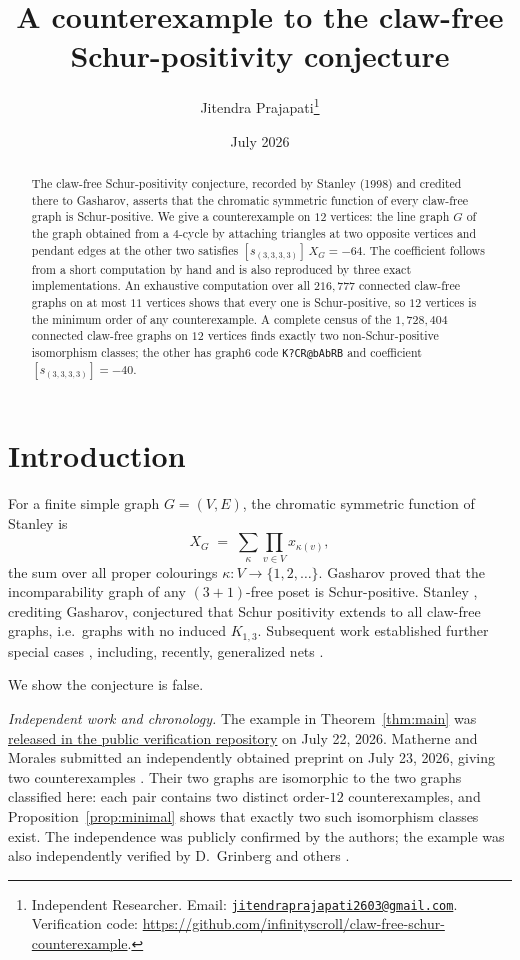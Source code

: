 \documentclass[11pt]{article}
\title{A counterexample to the claw-free Schur-positivity conjecture}
\author{Jitendra Prajapati\thanks{Independent Researcher. Email:
\href{mailto:jitendraprajapati2603@gmail.com}{\nolinkurl{jitendraprajapati2603@gmail.com}}. Verification code:
\url{https://github.com/infinityscroll/claw-free-schur-counterexample}.}}
\date{July 2026}
\theoremstyle{remark}
\newcommand{\csf}{X}
\begin{document}
\maketitle

\begin{abstract}
The claw-free Schur-positivity conjecture, recorded by Stanley (1998) and
credited there to Gasharov, asserts that the chromatic symmetric function of
every claw-free graph is Schur-positive. We give a counterexample
on $12$ vertices: the line graph $G$ of the graph obtained from a
$4$-cycle by attaching triangles at two opposite vertices and pendant edges
at the other two satisfies $[s_{(3,3,3,3)}]\,\csf_G = -64$. The coefficient
follows from a short computation by hand and is also reproduced by three exact
implementations. An exhaustive computation over all
$216{,}777$ connected claw-free graphs on at most $11$ vertices shows that
every one is Schur-positive, so $12$ vertices is the minimum order of any
counterexample. A complete census of the $1{,}728{,}404$ connected claw-free
graphs on $12$ vertices finds exactly two non-Schur-positive isomorphism
classes; the other has graph6 code
\texttt{K?\textasciigrave CR@\textasciigrave bAbRB} and coefficient
$[s_{(3,3,3,3)}]=-40$.
\end{abstract}

\section{Introduction}

For a finite simple graph $G = (V, E)$, the chromatic symmetric function of
Stanley \cite{Stanley95} is
\[
\csf_G \;=\; \sum_{\kappa} \prod_{v \in V} x_{\kappa(v)},
\]
the sum over all proper colourings $\kappa \colon V \to \{1, 2, \dots\}$.
Gasharov \cite{Gasharov96} proved that the incomparability graph of any
$(3+1)$-free poset is Schur-positive. Stanley
\cite[Conjecture~1.4]{Stanley98}, crediting Gasharov, conjectured that Schur
positivity extends to all claw-free graphs, i.e.\ graphs with no induced
$K_{1,3}$. Subsequent work established further special cases
\cite{Gasharov99}, including, recently, generalized nets \cite{SW25}.

We show the conjecture is false.

\emph{Independent work and chronology.} The example in
Theorem~\ref{thm:main} was
\href{https://github.com/infinityscroll/claw-free-schur-counterexample/commit/7747970833d8d4ce2dadba8f89a184cb52d814a9}
{released in the public verification repository} on July 22, 2026.
Matherne and Morales submitted an independently obtained
preprint on July 23, 2026, giving two counterexamples \cite{MM26}. Their two
graphs are isomorphic to the two graphs classified here: each pair contains
two distinct order-$12$ counterexamples, and Proposition~\ref{prop:minimal}
shows that exactly two such isomorphism classes exist. The independence was
publicly confirmed by the authors; the example was also independently
verified by D.~Grinberg and others \cite{MO}.
\end{document}
